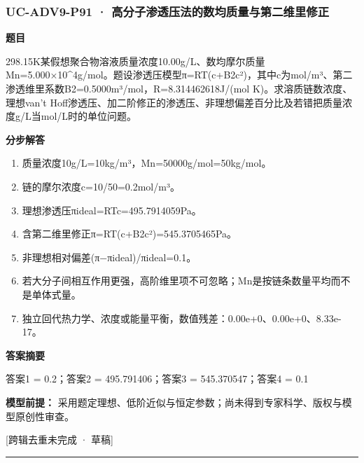 \documentclass[UTF8,11pt,a4paper]{ctexart}
\begin{document}
\subsubsection*{UC-ADV9-P91 · 高分子渗透压法的数均质量与第二维里修正}
\noindent\textbf{题目}\par
298.15K某假想聚合物溶液质量浓度10.00g/L、数均摩尔质量Mn=5.000×10\textasciicircum{}4g/mol。题设渗透压模型π=RT(c+B2c²)，其中c为mol/m³、第二渗透维里系数B2=0.5000m³/mol，R=8.314462618J/(mol K)。求溶质链数浓度、理想van't Hoff渗透压、加二阶修正的渗透压、非理想偏差百分比及若错把质量浓度g/L当mol/L时的单位问题。\par
\medskip\noindent\textbf{分步解答}
\begin{enumerate}
\item 质量浓度10g/L=10kg/m³，Mn=50000g/mol=50kg/mol。
\item 链的摩尔浓度c=10/50=0.2mol/m³。
\item 理想渗透压πideal=RTc=495.7914059Pa。
\item 含第二维里修正π=RT(c+B2c²)=545.3705465Pa。
\item 非理想相对偏差(π−πideal)/πideal=0.1。
\item 若大分子间相互作用更强，高阶维里项不可忽略；Mn是按链条数量平均而不是单体式量。
\item 独立回代热力学、浓度或能量平衡，数值残差：0.00e+0、0.00e+0、8.33e-17。
\end{enumerate}
\noindent\textbf{答案摘要}\par
答案1 = 0.2；答案2 = 495.791406；答案3 = 545.370547；答案4 = 0.1\par
\noindent\textbf{模型前提：}
采用题定理想、低阶近似与恒定参数；尚未得到专家科学、版权与模型原创性审查。\par
\noindent\textcolor{red!65!black}{[跨辑去重未完成 · 草稿]} \par
\medskip\hrule\medskip
{}
\end{document}
